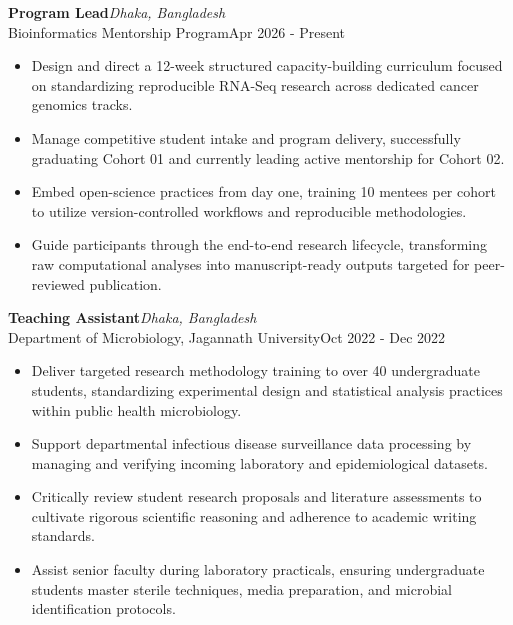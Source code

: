 \documentclass[
  11pt,
  letterpaper,
  DIV=11,
  numbers=noendperiod]{scrartcl}
\begin{document}
\noindent

\begin{minipage}{\linewidth}
\textbf{Program Lead}\hfill \textit{Dhaka, Bangladesh}\\
Bioinformatics Mentorship Program\hfill Apr 2026 - Present
\end{minipage}
\begin{itemize}[nosep,topsep=2pt,leftmargin=1em]
  \item Design and direct a 12-week structured capacity-building curriculum focused on standardizing reproducible RNA-Seq research across dedicated cancer genomics tracks.
  \item Manage competitive student intake and program delivery, successfully graduating Cohort 01 and currently leading active mentorship for Cohort 02.
  \item Embed open-science practices from day one, training 10 mentees per cohort to utilize version-controlled workflows and reproducible methodologies.
  \item Guide participants through the end-to-end research lifecycle, transforming raw computational analyses into manuscript-ready outputs targeted for peer-reviewed publication.
\end{itemize}
\vspace{5pt}

\noindent

\begin{minipage}{\linewidth}
\textbf{Teaching Assistant}\hfill \textit{Dhaka, Bangladesh}\\
Department of Microbiology, Jagannath University\hfill Oct 2022 - Dec 2022
\end{minipage}
\begin{itemize}[nosep,topsep=2pt,leftmargin=1em]
  \item Deliver targeted research methodology training to over 40 undergraduate students, standardizing experimental design and statistical analysis practices within public health microbiology.
  \item Support departmental infectious disease surveillance data processing by managing and verifying incoming laboratory and epidemiological datasets.
  \item Critically review student research proposals and literature assessments to cultivate rigorous scientific reasoning and adherence to academic writing standards.
  \item Assist senior faculty during laboratory practicals, ensuring undergraduate students master sterile techniques, media preparation, and microbial identification protocols.
\end{itemize}
\vspace{5pt}
\end{document}
